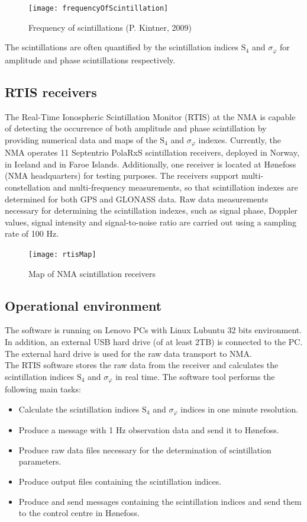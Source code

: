 \documentclass{themeensg}
\begin{document}
\begin{figure}[ht]
	\centering
	\texttt{[image: frequencyOfScintillation]}
	\caption{Frequency of scintillations (P. Kintner, 2009)}
	\label{frequencyOfScintillations}
\end{figure}

The scintillations are often quantified by the scintillation indices $\text{S}_{\text{4}}$ and $\sigma_\varphi$ for amplitude and phase scintillations respectively.

\subsection{RTIS receivers} 
The Real-Time Ionospheric Scintillation Monitor (RTIS) at the NMA is capable of detecting the occurrence of both amplitude and phase scintillation by providing numerical data and maps of the $\text{S}_{\text{4}}$ and $\sigma_\varphi$ indexes. Currently, the NMA operates 11 Septentrio PolaRxS scintillation receivers, deployed in Norway, in Iceland and in Faroe Islands. Additionally, one receiver is located at Hønefoss (NMA headquarters) for testing purposes. The receivers support multi-constellation and multi-frequency measurements, so that scintillation indexes are determined for both GPS and GLONASS data. Raw data measurements necessary for determining the scintillation indexes, such as signal phase, Doppler values, signal intensity and signal-to-noise ratio are carried out using a sampling rate of 100 Hz. \\
 
\begin{figure}[!hb]
	\centering
	\texttt{[image: rtisMap]}
	\caption{Map of NMA scintillation receivers}
	\label{map}
\end{figure}

\subsection{Operational environment}
The software is running on Lenovo PCs with Linux Lubuntu 32 bits environment. In addition, an external USB hard drive (of at least 2TB) is connected to the PC. The external hard drive is used for the raw data transport to NMA.\\

The RTIS software stores the raw data from the receiver and calculates the scintillation indices $\text{S}_{\text{4}}$ and $\sigma_\varphi$ in real time. 
The software tool performs the following main tasks:
\begin{itemize}
\item Calculate the scintillation indices $\text{S}_{\text{4}}$ and $\sigma_\varphi$ indices in one minute resolution.
\item Produce a message with 1 Hz observation data and send it to Hønefoss.
\item Produce raw data files necessary for the determination of scintillation parameters.
\item Produce output files containing the scintillation indices. 
\item Produce and send messages containing the scintillation indices and send them to the control centre in Hønefoss.
\end{itemize}
\end{document}
